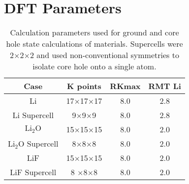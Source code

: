\section{DFT Parameters}
\begin{table}[H]
	\centering
	\caption{Calculation parameters used for ground and core hole state calculations of materials. Supercells were 2$\times$2$\times$2 and used non-conventional symmetries to isolate core hole onto a single atom. }
	\begin{tabular}{cccc}
		Case	& K points	& RKmax	& RMT Li				\\
		\hline
		Li	&17$\times$17$\times$17	&8.0	&2.8	\\
		Li Supercell	&9$\times$9$\times$9	&8.0	&2.8	\\
		$\mathrm{Li_2O}$	&15$\times$15$\times$15	&8.0	&2.0	\\
		$\mathrm{Li_2O}$ Supercell	& 8$\times$8$\times$8	&8.0	&2.0	\\
		LiF	&15$\times$15$\times$15&8.0	&2.0	\\
		LiF Supercell	&8 $\times$8$\times$8	&8.0	&2.0\\
	\end{tabular} 
	\label{calc_params}
\end{table}

